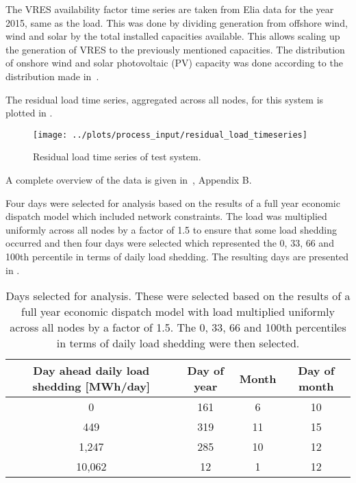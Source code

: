 \documentclass[number,times]{elsarticle}
\begin{document}
The \ac{VRES} availability factor time series are taken from Elia data for the year 2015, same as the load. This was done by dividing generation from offshore wind, wind and solar by the total installed capacities available. This allows scaling up the generation of \ac{VRES} to the previously mentioned capacities. The distribution of onshore wind and solar photovoltaic (PV) capacity was done according to the distribution made in~\cite{DelarueErik2016Dtio}.

The residual load time series, aggregated across all nodes, for this system is plotted in .

\begin{figure}[ht]
    \centering
    \texttt{[image: ../plots/process\_input/residual\_load\_timeseries]}
    \caption{Residual load time series of test system.\label{fig:residual_load_ts}}
\end{figure}

A complete overview of the data is given in~\cite{Belderbos2020}, Appendix B.

Four days were selected for analysis based on the results of a full year economic dispatch model which included network constraints. The load was multiplied uniformly across all nodes by a factor of 1.5 to ensure that some load shedding occurred and then four days were selected which represented the 0, 33, 66 and 100th percentile in terms of daily load shedding. The resulting days are presented in . 

\begin{table}[ht]
    \centering
    \begin{tabular}{cccc}
        \toprule
        Day ahead daily load shedding [MWh/day] & Day of year & Month & Day of month \\
        \midrule
        0                                       & 161         & 6     & 10           \\
        449                                     & 319         & 11    & 15           \\
        1,247                                   & 285         & 10    & 12           \\
        10,062                                  & 12          & 1     & 12           \\
        \bottomrule
    \end{tabular}
    \caption{Days selected for analysis. These were selected based on the results of a full year economic dispatch model with load multiplied uniformly across all nodes by a factor of 1.5. The 0, 33, 66 and 100th percentiles in terms of daily load shedding were then selected.}\label{tab:day_selection}
\end{table}
\end{document}
